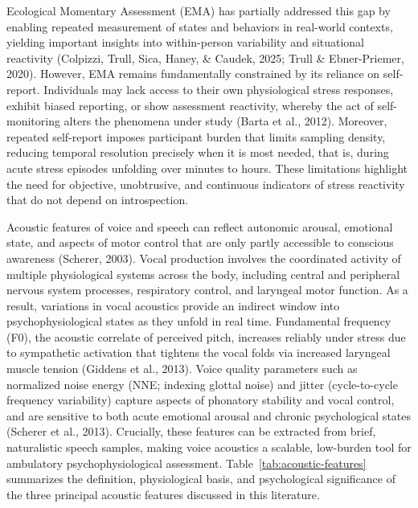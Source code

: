 \documentclass[
  english,
  man]{apa6}
\begin{document}
Ecological Momentary Assessment (EMA) has partially addressed this gap by enabling repeated measurement of states and behaviors in real-world contexts, yielding important insights into within-person variability and situational reactivity (Colpizzi, Trull, Sica, Haney, \& Caudek, 2025; Trull \& Ebner-Priemer, 2020). However, EMA remains fundamentally constrained by its reliance on self-report. Individuals may lack access to their own physiological stress responses, exhibit biased reporting, or show assessment reactivity, whereby the act of self-monitoring alters the phenomena under study (Barta et al., 2012). Moreover, repeated self-report imposes participant burden that limits sampling density, reducing temporal resolution precisely when it is most needed, that is, during acute stress episodes unfolding over minutes to hours. These limitations highlight the need for objective, unobtrusive, and continuous indicators of stress reactivity that do not depend on introspection.

Acoustic features of voice and speech can reflect autonomic arousal, emotional state, and aspects of motor control that are only partly accessible to conscious awareness (Scherer, 2003). Vocal production involves the coordinated activity of multiple physiological systems across the body, including central and peripheral nervous system processes, respiratory control, and laryngeal motor function. As a result, variations in vocal acoustics provide an indirect window into psychophysiological states as they unfold in real time. Fundamental frequency (F0), the acoustic correlate of perceived pitch, increases reliably under stress due to sympathetic activation that tightens the vocal folds via increased laryngeal muscle tension (Giddens et al., 2013). Voice quality parameters such as normalized noise energy (NNE; indexing glottal noise) and jitter (cycle-to-cycle frequency variability) capture aspects of phonatory stability and vocal control, and are sensitive to both acute emotional arousal and chronic psychological states (Scherer et al., 2013). Crucially, these features can be extracted from brief, naturalistic speech samples, making voice acoustics a scalable, low-burden tool for ambulatory psychophysiological assessment. Table~\ref{tab:acoustic-features} summarizes the definition, physiological basis, and psychological significance of the three principal acoustic features discussed in this literature.
\end{document}
